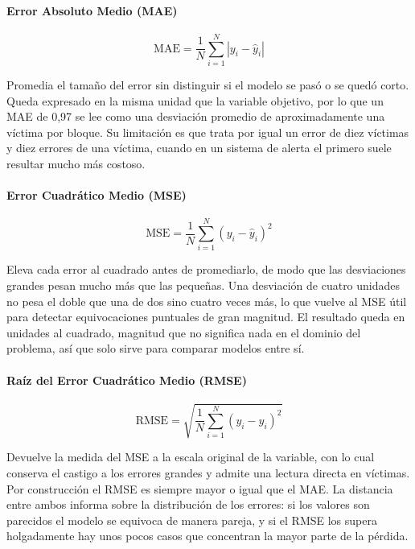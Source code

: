 \paragraph{Error Absoluto Medio (MAE)}

\begin{equation}
\mathrm{MAE} = \frac{1}{N} \sum_{i=1}^{N} \left| y_i - \hat{y}_i \right|
\label{eq:mae}
\end{equation}

Promedia el tamaño del error sin distinguir si el modelo se pasó o se quedó corto. Queda expresado en la misma unidad que la variable objetivo, por lo que un MAE de 0,97 se lee como una desviación promedio de aproximadamente una víctima por bloque. Su limitación es que trata por igual un error de diez víctimas y diez errores de una víctima, cuando en un sistema de alerta el primero suele resultar mucho más costoso.

\paragraph{Error Cuadrático Medio (MSE)}

\begin{equation}
\mathrm{MSE} = \frac{1}{N} \sum_{i=1}^{N} \left( y_i - \hat{y}_i \right)^{2}
\label{eq:mse}
\end{equation}

Eleva cada error al cuadrado antes de promediarlo, de modo que las desviaciones grandes pesan mucho más que las pequeñas. Una desviación de cuatro unidades no pesa el doble que una de dos sino cuatro veces más, lo que vuelve al MSE útil para detectar equivocaciones puntuales de gran magnitud. El resultado queda en unidades al cuadrado, magnitud que no significa nada en el dominio del problema, así que solo sirve para comparar modelos entre sí.

\paragraph{Raíz del Error Cuadrático Medio (RMSE)}

\begin{equation}
\mathrm{RMSE} = \sqrt{\frac{1}{N} \sum_{i=1}^{N} \left( y_i - \hat{y}_i \right)^{2}}
\label{eq:rmse}
\end{equation}

Devuelve la medida del MSE a la escala original de la variable, con lo cual conserva el castigo a los errores grandes y admite una lectura directa en víctimas. Por construcción el RMSE es siempre mayor o igual que el MAE. La distancia entre ambos informa sobre la distribución de los errores: si los valores son parecidos el modelo se equivoca de manera pareja, y si el RMSE los supera holgadamente hay unos pocos casos que concentran la mayor parte de la pérdida.

